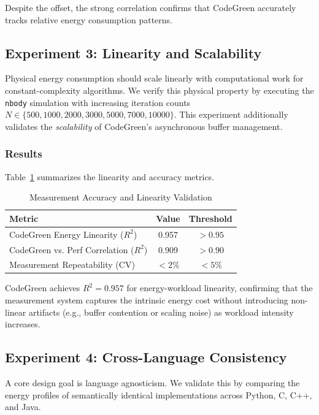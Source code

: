 Despite the offset, the strong correlation confirms that CodeGreen accurately tracks relative energy consumption patterns.

\subsection{Experiment 3: Linearity and Scalability}

Physical energy consumption should scale linearly with computational work for constant-complexity algorithms. We verify this physical property by executing the \texttt{nbody} simulation with increasing iteration counts $N \in \{500, 1000, 2000, 3000, 5000, 7000, 10000\}$. This experiment additionally validates the \textit{scalability} of CodeGreen's asynchronous buffer management.

\subsubsection{Results}

Table~\ref{tab:accuracy} summarizes the linearity and accuracy metrics.

\begin{table}[htbp]
\centering
\caption{Measurement Accuracy and Linearity Validation}
\label{tab:accuracy}
\begin{tabular}{lcc}
\toprule
Metric & Value & Threshold \\
\midrule
CodeGreen Energy Linearity ($R^2$) & 0.957 & $>0.95$ \\
CodeGreen vs. Perf Correlation ($R^2$) & 0.909 & $>0.90$ \\
Measurement Repeatability (CV) & $<2\%$ & $<5\%$ \\
\bottomrule
\end{tabular}
\end{table}

CodeGreen achieves $R^2 = 0.957$ for energy-workload linearity, confirming that the measurement system captures the intrinsic energy cost without introducing non-linear artifacts (e.g., buffer contention or scaling noise) as workload intensity increases.

\subsection{Experiment 4: Cross-Language Consistency}

A core design goal is language agnosticism. We validate this by comparing the energy profiles of semantically identical implementations across Python, C, C++, and Java.

